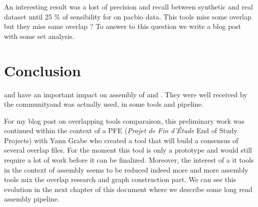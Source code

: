 \documentclass[main.tex]{subfiles}
\begin{document}
An interesting result was a lost of precision and recall between synthetic and real dataset until 25 \% of sensibility for  on pacbio data. This tools miss some overlap but they miss same overlap ? To answer to this question we write a blog post with some set analysis.



\section{Conclusion}

\yacrd and \fpa have an important impact on assembly of \miniasm and \wtdbg. They were well received by the community\yacrd and \fpa was actually used, in some tools and pipeline.

For my blog post on overlapping tools comparaison, this preliminary work was continued within the context of a PFE (\textit{Projet de Fin d'Étude} End of Study Projects) with Yann Grabe who created a tool that will build a consensus of several overlap files. For the moment this tool is only a prototype and would still require a lot of work before it can be finalized. Moreover, the interest of a it tools in the context of assembly seems to be reduced indeed more and more assembly tools mix the overlap research and graph construction part. We can see this evolution in the next chapter of this document where we describe some long read assembly pipeline.


\end{document}
